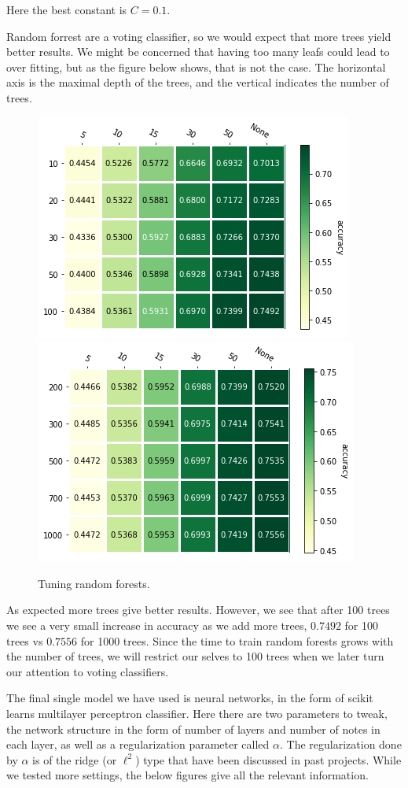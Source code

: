 \documentclass[parskip=half]{scrartcl}
\theoremstyle{definition}
\theoremstyle{remark}
\begin{document}
Here the best constant is $C = 0.1$.

Random forrest are a voting classifier, so we would expect that more trees yield better results. 
We might be concerned that having too many leafs could lead to over fitting, but as the figure below shows, that is not the case. 
The horizontal axis is the maximal depth of the trees, and the vertical indicates the number of trees. 
 
\begin{figure}[H]
\caption{Tuning random forests.}
\centering
\includegraphics[scale=0.6]{images/forrest_params1.png}
\includegraphics[scale=0.6]{images/forrest_params2.png}
\end{figure}

As expected more trees give better results. 
However, we see that after 100 trees we see a very small increase in accuracy as we add more trees, $0.7492$ for 100 trees vs $0.7556$ for 1000 trees. 
Since the time to train random forests grows with the number of trees, we will restrict our selves to 100 trees when we later turn our attention to voting classifiers. 

The final single model we have used is neural networks, in the form of scikit learns multilayer perceptron classifier. 
Here there are two parameters to tweak, the network structure in the form of number of layers and number of notes in each layer, as well as a regularization parameter called $\alpha$.
The regularization done by $\alpha$ is of the ridge (or $\ell^2$) type that have been discussed in past projects. 
While we tested more settings, the below figures give all the relevant information.
\end{document}

